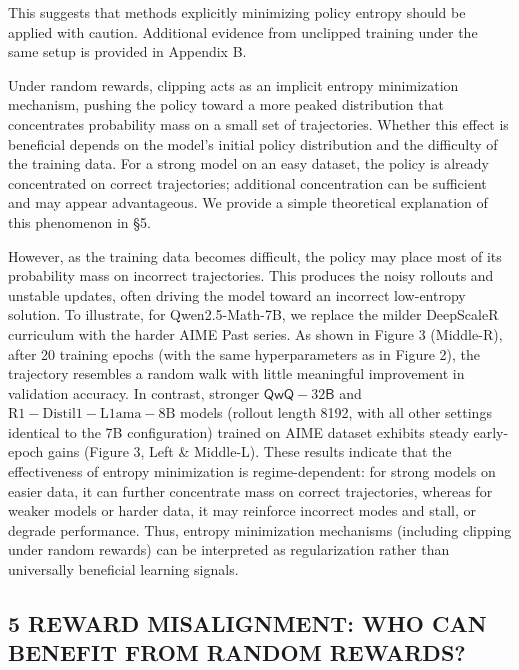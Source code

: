 \documentclass[
  10
]{article}
\begin{document}
This suggests that methods explicitly minimizing policy entropy should
be applied with caution. Additional evidence from unclipped training
under the same setup is provided in Appendix B.

Under random rewards, clipping acts as an implicit entropy minimization
mechanism, pushing the policy toward a more peaked distribution that
concentrates probability mass on a small set of trajectories. Whether
this effect is beneficial depends on the model's initial policy
distribution and the difficulty of the training data. For a strong model
on an easy dataset, the policy is already concentrated on correct
trajectories; additional concentration can be sufficient and may appear
advantageous. We provide a simple theoretical explanation of this
phenomenon in §5.

However, as the training data becomes difficult, the policy may place
most of its probability mass on incorrect trajectories. This produces
the noisy rollouts and unstable updates, often driving the model toward
an incorrect low-entropy solution. To illustrate, for Qwen2.5-Math-7B,
we replace the milder DeepScaleR curriculum with the harder AIME Past
series. As shown in Figure 3 (Middle-R), after 20 training epochs (with
the same hyperparameters as in Figure 2), the trajectory resembles a
random walk with little meaningful improvement in validation accuracy.
In contrast, stronger \(\mathsf { Q w Q - } 3 2 \mathsf { B }\) and
\(\mathrm { R 1 - D i s t i l 1 - L 1 a m a - 8 B }\) models (rollout
length 8192, with all other settings identical to the 7B configuration)
trained on AIME dataset exhibits steady early-epoch gains (Figure 3,
Left \& Middle-L). These results indicate that the effectiveness of
entropy minimization is regime-dependent: for strong models on easier
data, it can further concentrate mass on correct trajectories, whereas
for weaker models or harder data, it may reinforce incorrect modes and
stall, or degrade performance. Thus, entropy minimization mechanisms
(including clipping under random rewards) can be interpreted as
regularization rather than universally beneficial learning signals.

\subsection{5 REWARD MISALIGNMENT: WHO CAN BENEFIT FROM RANDOM
REWARDS?}\label{reward-misalignment-who-can-benefit-from-random-rewards}
\end{document}
